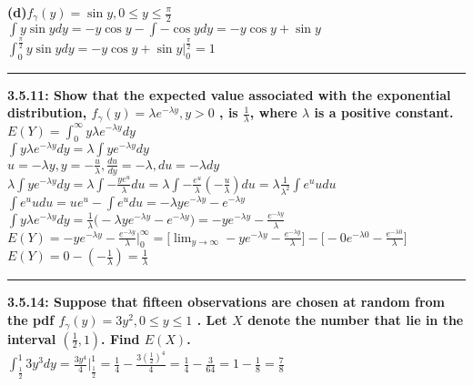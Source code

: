 \documentclass[11pt]{article}
\newcommand\question[2]{\vspace{.25in}\hrule\textbf{#1: #2}\vspace{.5em}\vspace{.10in}}
\renewcommand\part[1]{\vspace{.10in}\textbf{(#1)}}
\begin{document}
\part{d}$f_{\gamma} (y) = \sin y, 0 \leq y \leq \frac{\pi}{2}$
\\
$
\int y \sin y dy 
= 
-y\cos y - \int - \cos y dy
=
-y \cos y + \sin y
$
\\
$
\int_{0}^{\frac{\pi}{2}} y \sin y dy 
=
-y \cos y + \sin y \Big|_{0}^{\frac{\pi}{2}}
=
1
$


\question{3.5.11}
{Show that the expected value associated with the exponential distribution,
$f_{\gamma} (y) = \lambda e^{- \lambda y},y > 0$
, is $\frac{1}{\lambda}$, where $\lambda$ is a positive constant.}
\\
$
E(Y) = \int_{0}^{\infty} y \lambda e^{- \lambda y} dy
$
\\
$
\int y \lambda e^{ - \lambda y} dy 
= 
\lambda \int y e^{- \lambda y} dy
$
\\
$
u = - \lambda y, y = -\frac{u}{\lambda},\frac{du}{dy} = - \lambda, du = - \lambda dy
$
\\
$
\lambda \int y e^{- \lambda y} dy 
= 
\lambda \int -\frac{y e^{u}}{\lambda}du
=
\lambda \int -\frac{e^{u}}{\lambda}(-\frac{u}{\lambda})du
=
\lambda \frac{1}{\lambda^{2}} \int e^{u}udu
$
\\
$
\int e^{u}udu = ue^{u} - \int e^{u}du
=
- \lambda y e^{- \lambda y} - e^{- \lambda y}
$
\\
$
\int y \lambda e^{ - \lambda y} dy 
=
\frac{1}{\lambda} \Big(- \lambda y e^{- \lambda y} - e^{- \lambda y}\Big)
=
-ye^{ - \lambda y} - \frac{e^{- \lambda y}}{\lambda}
$
\\
$
E(Y)
=
-ye^{ - \lambda y} - \frac{e^{- \lambda y}}{\lambda} \Big |_{0}^{\infty}
=
\Big[\lim_{y\to\infty} 
-ye^{ - \lambda y} - \frac{e^{- \lambda y}}{\lambda} \Big]
-
\Big[
    -0e^{ - \lambda 0} - \frac{e^{- \lambda 0}}{\lambda}
\Big]
$
\\
$
E(Y) = 0 - (-\frac{1}{\lambda}) = \frac{1}{\lambda}
$



\question{3.5.14}
{Suppose that fifteen observations are chosen at random from the pdf 
$f_{\gamma} (y) = 3y^{2}, 0 \leq y \leq 1$
. Let $X$ denote the number that lie in the interval 
$(\frac{1}{2}, 1)$. Find $E(X)$.}
\\
$
\int_{\frac{1}{2}}^{1} 3 y^{3} dy 
=
\frac{3y^{4}}{4} \big |_{\frac{1}{2}}^{1}
=
\frac{1}{4} - \frac{3(\frac{1}{2})^{4}}{4}
=
\frac{1}{4} - \frac{3}{64}
=
1 - \frac{1}{8}
=
\frac{7}{8}
$
\end{document}
